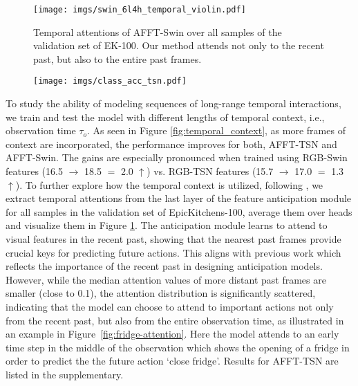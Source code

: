 \documentclass[10pt,twocolumn,letterpaper,dvipsnames]{article}
\newcommand{\sname}{AFFT}
\begin{document}
\begin{figure}[t]
    \centering
    \texttt{[image: imgs/swin\_6l4h\_temporal\_violin.pdf]}
    \caption{Temporal attentions of \sname-Swin over all samples of the validation set of EK-100. Our method attends not only to the recent past, but also to the entire past frames.}
    \label{fig:temporal_attention_swin}
\end{figure}
\begin{figure*}[t]
    \centering
    \begin{subfigure}{\linewidth}
        \texttt{[image: imgs/class\_acc\_tsn.pdf]}
    \end{subfigure}
    \vspace{-0.6cm}
    \caption{Per-class top-5 accuracy of fusion (\sname-TSN) and single modalities for the largest 25 actions in the validation set of EpicKitchens-100. The classes are presented in the order of number of samples per class, from left to right. For most classes the fusion method provides significantly better results over the single modalities.}
    \label{fig:class_acc_tsn}
\end{figure*}
To study the ability of modeling sequences of long-range temporal interactions, we train and test the model with different lengths of temporal context, i.e., observation time $\tau_o$. As seen in Figure \ref{fig:temporal_context}, as more frames of context are incorporated, the performance improves for both, \sname-TSN and \sname-Swin. The gains are especially pronounced when trained using RGB-Swin features (16.5 $\rightarrow$ 18.5 $=$ 2.0 $\uparrow$) vs. RGB-TSN features (15.7 $\rightarrow$ 17.0 $=$ 1.3 $\uparrow$). To further explore how the temporal context is utilized, following \cite{girdharAnticipativeVideoTransformer2021}, we extract temporal attentions from the last layer of the feature anticipation module for all samples in the validation set of EpicKitchens-100, average them over heads and visualize them in Figure \ref{fig:temporal_attention_swin}. The anticipation module learns to attend to visual features in the recent past, showing that the nearest past frames provide crucial keys for predicting future actions. This aligns with previous work \cite{keTimeConditionedActionAnticipation2019,senerTemporalAggregateRepresentations2020} which reflects the importance of the recent past in designing anticipation models. However, while the median attention values of more distant past frames are smaller (close to 0.1), the attention distribution is significantly scattered, indicating that the model can choose to attend to important actions not only from the recent past, but also from the entire observation time, as illustrated in an example in Figure~\ref{fig:fridge-attention}. Here the model attends to an early time step in the middle of the observation which shows the opening of a fridge in order to predict the the future action `close fridge'. Results for \sname-TSN are listed in the supplementary.
\end{document}
